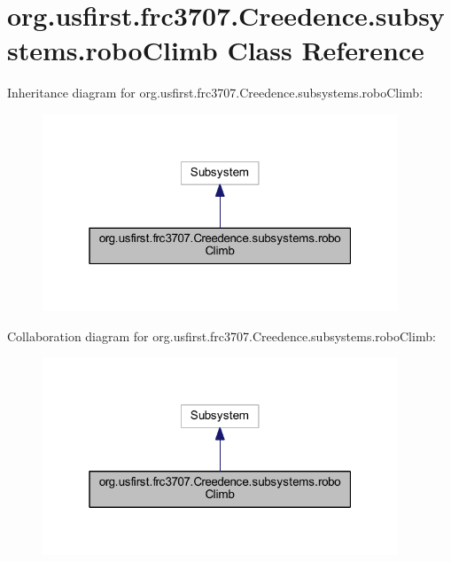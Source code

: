\hypertarget{classorg_1_1usfirst_1_1frc3707_1_1_creedence_1_1subsystems_1_1robo_climb}{}\section{org.\+usfirst.\+frc3707.\+Creedence.\+subsystems.\+robo\+Climb Class Reference}
\label{classorg_1_1usfirst_1_1frc3707_1_1_creedence_1_1subsystems_1_1robo_climb}


Inheritance diagram for org.\+usfirst.\+frc3707.\+Creedence.\+subsystems.\+robo\+Climb\+:
\nopagebreak
\begin{figure}[H]
\begin{center}
\leavevmode
\includegraphics[width=301pt]{classorg_1_1usfirst_1_1frc3707_1_1_creedence_1_1subsystems_1_1robo_climb__inherit__graph}
\end{center}
\end{figure}


Collaboration diagram for org.\+usfirst.\+frc3707.\+Creedence.\+subsystems.\+robo\+Climb\+:
\nopagebreak
\begin{figure}[H]
\begin{center}
\leavevmode
\includegraphics[width=301pt]{classorg_1_1usfirst_1_1frc3707_1_1_creedence_1_1subsystems_1_1robo_climb__coll__graph}
\end{center}
\end{figure}
